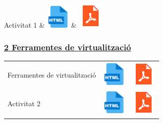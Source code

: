 \documentclass[
  12 pt,
  a4paper,
]{article}
\begin{document}
\begin{longtable}[]
Activitat 1 &
\href{U1-INTRODUCCIÓ_ALS_SISTEMES_INFORMÀTICS/U1-Exercicis.html}{\includegraphics{recursos/iconohtml.png}}
&
\href{U1-INTRODUCCIÓ_ALS_SISFORMÀTICS/U1-Exercicis.pdf}{\includegraphics{recursos/iconopdf.png}} \\
\end{longtable}

\subsubsection{\texorpdfstring{\hyperref[U2]{2 Ferramentes de
virtualització}}{2 Ferramentes de virtualització}}\label{ferramentes-de-virtualitzaciuxf3}

\begin{longtable}[]{@{}
  >{\raggedright\arraybackslash}p{}
  >{\raggedright\arraybackslash}p{}
  >{\raggedright\arraybackslash}p{}@{}}
\toprule\noalign{}
\endhead
\bottomrule\noalign{}
\endlastfoot
Ferramentes de virtualització &
\href{U2-FERRAMENTES_DE_VIRTUALITZACIÓ/UNITAT-2-Ferramentes-de-virtualització.html}{\includegraphics{recursos/iconohtml.png}}
&
\href{U2-FERRAMENTES_DE_VIRTUALITZACIÓ/UNITAT-2-Ferramentes-de-virtualització.pdf}{\includegraphics{recursos/iconopdf.png}} \\
Activitat 2 &
\href{U2-FERRAMENTES_DE_VIRTUALITZACIÓ/U2-Activitat2.html}{\includegraphics{recursos/iconohtml.png}}
&
\href{U2-FERRAMENTES_DE_VIRTUALITZACIÓ/U2-Activitat2.pdf}{\includegraphics{recursos/iconopdf.png}} \\
\end{longtable}
\end{document}
